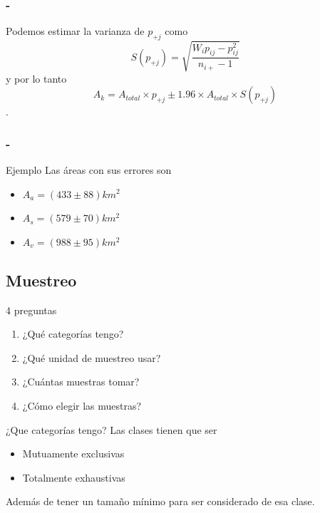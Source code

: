 \documentclass[]{beamer}
\begin{document}
\begin{frame}
    \frametitle{\secname-\subsecname}
    Podemos estimar la varianza de $p_{+j}$ como
    \begin{equation}
        S(p_{+j}) = \sqrt{\frac{W_i p_{ij} - p_{ij}^2}{n_{i+}-1}}
    \end{equation}\pause
    y por lo tanto $$A_k = A_{total} \times p_{+j} \pm 1.96 \times
    A_{total}\times S(p_{+j})$$.
\end{frame}

\begin{frame}
    \frametitle{\secname-\subsecname}
 \begin{exampleblock}{Ejemplo}
     Las áreas con sus errores son
     \begin{itemize}
         \item $A_a = (433\pm88)km^2$
         \item $A_s = (579\pm70)km^2$
         \item $A_v = (988\pm95)km^2$
     \end{itemize}
  \end{exampleblock}

\end{frame}

\subsection{Muestreo}

\begin{frame}{\subsecname}
  \begin{block}{4 preguntas}
  \begin{enumerate}
    \item ¿Qué categorías tengo?
    \item ¿Qué unidad de muestreo usar?
    \item ¿Cuántas muestras tomar?
    \item ¿Cómo elegir las muestras?
  \end{enumerate}
  \end{block}
\end{frame}

\begin{frame}{\subsecname}
  \begin{block}{¿Que categorías tengo?}
    Las clases tienen que ser \pause
    \begin{itemize}[<+>]
      \item Mutuamente exclusivas
      \item Totalmente exhaustivas
    \end{itemize}
    Además de tener un tamaño mínimo para ser considerado de esa clase.
  \end{block}
\end{frame}
\end{document}
